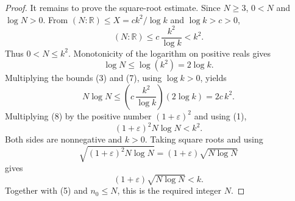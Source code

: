 \begin{proof}
It remains to prove the square-root estimate.  Since \(N\ge3\), \(0<N\) and
\(\log N>0\).  From \((N:\mathbb R)\le X=c k^2/\log k\) and \(\log k>c>0\),
\[
(N:\mathbb R)\le c\,\frac{k^2}{\log k}<k^2. \tag{6}
\]
Thus \(0<N\le k^2\).  Monotonicity of the logarithm on positive reals gives
\[
\log N\le \log(k^2)=2\log k. \tag{7}
\]
Multiplying the bounds (3) and (7), using \(\log k>0\), yields
\[
N\log N\le
\left(c\,\frac{k^2}{\log k}\right)(2\log k)=2c\,k^2. \tag{8}
\]
Multiplying (8) by the positive number \((1+\varepsilon)^2\) and using (1),
\[
(1+\varepsilon)^2N\log N<k^2. \tag{9}
\]
Both sides are nonnegative and \(k>0\).  Taking square roots and using
\[
\sqrt{(1+\varepsilon)^2N\log N}
=(1+\varepsilon)\sqrt{N\log N}
\]
gives
\[
(1+\varepsilon)\sqrt{N\log N}<k.
\]
Together with (5) and \(n_0\le N\), this is the required integer \(N\).
\end{proof}
